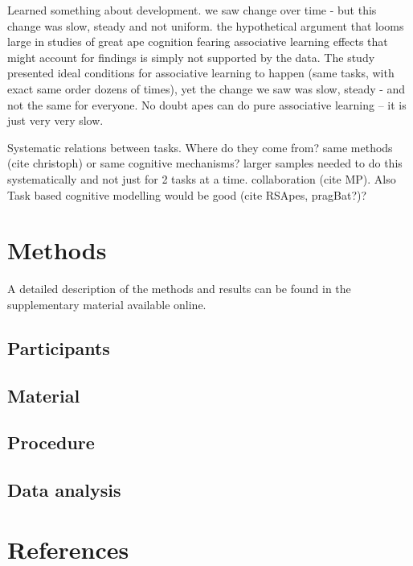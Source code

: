 \documentclass[
  man,floatsintext]{apa6}
\begin{document}
Learned something about development. we saw change over time - but this change was slow, steady and not uniform. the hypothetical argument that looms large in studies of great ape cognition fearing associative learning effects that might account for findings is simply not supported by the data. The study presented ideal conditions for associative learning to happen (same tasks, with exact same order dozens of times), yet the change we saw was slow, steady - and not the same for everyone. No doubt apes can do pure associative learning -- it is just very very slow.

Systematic relations between tasks. Where do they come from? same methods (cite christoph) or same cognitive mechanisms? larger samples needed to do this systematically and not just for 2 tasks at a time. collaboration (cite MP). Also Task based cognitive modelling would be good (cite RSApes, pragBat?)?

\hypertarget{methods}{%
\section{Methods}\label{methods}}

A detailed description of the methods and results can be found in the supplementary material available online.

\hypertarget{participants}{%
\subsection{Participants}\label{participants}}

\hypertarget{material}{%
\subsection{Material}\label{material}}

\hypertarget{procedure}{%
\subsection{Procedure}\label{procedure}}

\hypertarget{data-analysis}{%
\subsection{Data analysis}\label{data-analysis}}

\newpage

\hypertarget{references}{%
\section{References}\label{references}}
\end{document}
